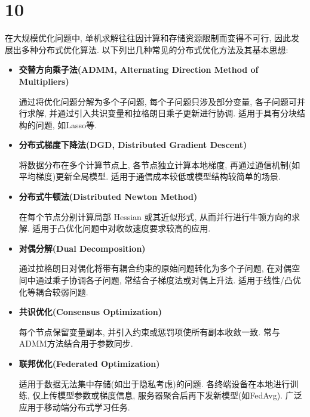 \section*{10}

在大规模优化问题中, 单机求解往往因计算和存储资源限制而变得不可行, 因此发展出多种分布式优化算法.
以下列出几种常见的分布式优化方法及其基本思想:

\begin{itemize}
    \item
        \textbf{交替方向乘子法(ADMM, Alternating Direction Method of Multipliers)}

        通过将优化问题分解为多个子问题, 每个子问题只涉及部分变量, 各子问题可并行求解, 并通过引入共识变量和拉格朗日乘子更新进行协调.
        适用于具有分块结构的问题, 如Lasso等.

    \item
        \textbf{分布式梯度下降法(DGD, Distributed Gradient Descent)}

        将数据分布在多个计算节点上, 各节点独立计算本地梯度, 再通过通信机制(如平均梯度)更新全局模型.
        适用于通信成本较低或模型结构较简单的场景.

    \item
        \textbf{分布式牛顿法(Distributed Newton Method)}

        在每个节点分别计算局部 Hessian 或其近似形式, 从而并行进行牛顿方向的求解.
        适用于凸优化问题中对收敛速度要求较高的应用.

    \item
        \textbf{对偶分解(Dual Decomposition)}

        通过拉格朗日对偶化将带有耦合约束的原始问题转化为多个子问题, 在对偶空间中通过乘子协调各子问题, 常结合子梯度法或对偶上升法.
        适用于线性/凸优化等耦合较弱问题.

    \item
        \textbf{共识优化(Consensus Optimization)}

        每个节点保留变量副本, 并引入约束或惩罚项使所有副本收敛一致.
        常与ADMM方法结合用于参数同步.

    \item
        \textbf{联邦优化(Federated Optimization)}

        适用于数据无法集中存储(如出于隐私考虑)的问题.
        各终端设备在本地进行训练, 仅上传模型参数或梯度信息, 服务器聚合后再下发新模型(如FedAvg).
        广泛应用于移动端分布式学习任务.

\end{itemize}
